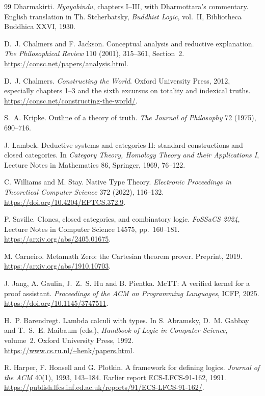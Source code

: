 \documentclass[11pt,a4paper]{article}
\theoremstyle{plain}
\theoremstyle{definition}
\theoremstyle{remark}
\begin{document}
\begin{thebibliography}{99}
Dharmakirti. \emph{Nyayabindu}, chapters I--III, with Dharmottara's commentary.
English translation in Th. Stcherbatsky, \emph{Buddhist Logic}, vol.~II,
Bibliotheca Buddhica XXVI, 1930.

D.~J. Chalmers and F. Jackson. Conceptual analysis and reductive explanation.
\emph{The Philosophical Review} 110 (2001), 315--361, Section~2.
\url{https://consc.net/papers/analysis.html}.

D.~J. Chalmers. \emph{Constructing the World}. Oxford University Press, 2012,
especially chapters 1--3 and the sixth excursus on totality and indexical truths.
\url{https://consc.net/constructing-the-world/}.

S.~A. Kripke. Outline of a theory of truth.
\emph{The Journal of Philosophy} 72 (1975), 690--716.

J. Lambek. Deductive systems and categories II: standard constructions and
closed categories. In \emph{Category Theory, Homology Theory and their
Applications I}, Lecture Notes in Mathematics 86, Springer, 1969, 76--122.

C. Williams and M. Stay. Native Type Theory.
\emph{Electronic Proceedings in Theoretical Computer Science} 372 (2022),
116--132. \url{https://doi.org/10.4204/EPTCS.372.9}.

P. Saville. Clones, closed categories, and combinatory logic.
\emph{FoSSaCS 2024}, Lecture Notes in Computer Science 14575, pp.~160--181.
\url{https://arxiv.org/abs/2405.01675}.

M. Carneiro. Metamath Zero: the Cartesian theorem prover.
Preprint, 2019. \url{https://arxiv.org/abs/1910.10703}.

J. Jang, A. Gaulin, J.~Z.~S. Hu and B. Pientka.
McTT: A verified kernel for a proof assistant.
\emph{Proceedings of the ACM on Programming Languages}, ICFP, 2025.
\url{https://doi.org/10.1145/3747511}.

H.~P. Barendregt. Lambda calculi with types.
In S. Abramsky, D.~M. Gabbay and T.~S.~E. Maibaum (eds.),
\emph{Handbook of Logic in Computer Science}, volume~2.
Oxford University Press, 1992.
\url{https://www.cs.ru.nl/~henk/papers.html}.

R. Harper, F. Honsell and G. Plotkin. A framework for defining logics.
\emph{Journal of the ACM} 40(1), 1993, 143--184.
Earlier report ECS-LFCS-91-162, 1991.
\url{https://publish.lfcs.inf.ed.ac.uk/reports/91/ECS-LFCS-91-162/}.


\end{thebibliography}
\end{document}
